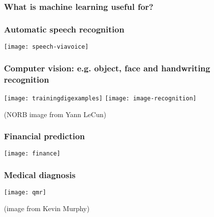 \begin{frame}
\frametitle{What is machine learning useful for?}
\end{frame}

\begin{frame}
\frametitle{Automatic speech recognition}

\centerline{\texttt{[image: speech-viavoice]}}
\end{frame}

\begin{frame}
\frametitle{Computer vision: e.g. object, face and handwriting recognition}

\centerline{
\texttt{[image: trainingdigexamples]}
\texttt{[image: image-recognition]}}


\hfill {\small (NORB image from Yann LeCun)}
\end{frame}
\begin{frame}
\frametitle{Financial prediction}

\centerline{\texttt{[image: finance]}}

\end{frame}
\begin{frame}
\frametitle{Medical diagnosis}

\centerline{\texttt{[image: qmr]}}

\centerline{\small (image from Kevin Murphy)}
\end{frame}
